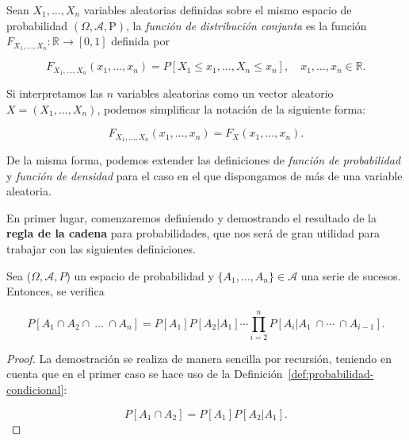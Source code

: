 \begin{definicion}\label{def:funcion-de-distribucion-conjunta}
    Sean $X_1, \ldots, X_n$ variables aleatorias definidas sobre el mismo espacio de probabilidad $(\Omega, \mathcal{A}, \mathrm{P})$, la \emph{función de distribución conjunta} es la función $F_{X_{1}, \ldots, X_{n}}: \mathbb{R} \to [0,1]$ definida por

    \[ F_{X_{1}, \ldots, X_{n}}(x_1, \ldots, x_n) = P[X_1 \leq x_1, \ldots, X_n \leq x_n], \quad x_1, \ldots, x_n \in \mathbb{R}. \]

    Si interpretamos las $n$ variables aleatorias como un vector aleatorio $X = (X_1, \ldots, X_n)$, podemos simplificar la notación de la siguiente forma:

    \[ F_{X_{1}, \ldots, X_{n}}(x_1, \ldots, x_n) = F_X(x_1, \ldots, x_n). \]
\end{definicion}

De la misma forma, podemos extender las definiciones de \emph{función de probabilidad} y \emph{función de densidad} para el caso en el que dispongamos de más de una variable aleatoria.

En primer lugar, comenzaremos definiendo y demostrando el resultado de la \textbf{regla de la cadena} para probabilidades, que nos será de gran utilidad para trabajar con las siguientes definiciones.

\begin{teorema}
    Sea ($\Omega, \mathcal{A}, P$) un espacio de probabilidad y $\{A_1, \ldots, A_n \} \in \mathcal{A}$ una serie de sucesos. Entonces, se verifica

    \[ P[A_1 \cap A_2 \cap \ \ldots \ \cap A_n] =  P[A_1]P[A_2 | A_1]\cdots \prod_{i=2}^n P[A_i | A_1 \ \cap \cdots \ \cap A_{i-1}]. \]
\end{teorema}

\begin{proof}
    La demostración se realiza de manera sencilla por recursión, teniendo en cuenta que en el primer caso se hace uso de la Definición~\ref{def:probabilidad-condicional}:

    \[ P[A_1 \cap A_2] = P[A_1]P[A_2| A_1]. \]
\end{proof}

